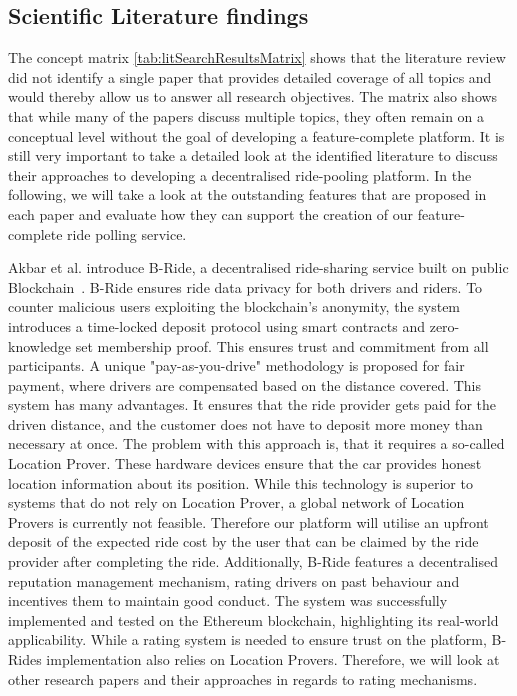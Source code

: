 \subsection{Scientific Literature findings}
The concept matrix \ref{tab:litSearchResultsMatrix} shows that the literature review did not identify a single paper that provides detailed coverage of all topics and would thereby allow us to answer all research objectives. The matrix also shows that while many of the papers discuss multiple topics, they often remain on a conceptual level without the goal of developing a feature-complete platform. It is still very important to take a detailed look at the identified literature to discuss their approaches to developing a decentralised ride-pooling platform. In the following, we will take a look at the outstanding features that are proposed in each paper and evaluate how they can support the creation of our feature-complete ride polling service.


Akbar et al. introduce B-Ride, a decentralised ride-sharing service built on public Blockchain~\cite{Baza.2021}. B-Ride ensures ride data privacy for both drivers and riders. To counter malicious users exploiting the blockchain's anonymity, the system introduces a time-locked deposit protocol using smart contracts and zero-knowledge set membership proof. This ensures trust and commitment from all participants. A unique "pay-as-you-drive" methodology is proposed for fair payment, where drivers are compensated based on the distance covered. This 
system has many advantages. It ensures that the ride provider gets paid for the driven distance, and the customer does not have to deposit more money than necessary at once. The problem with this approach is, that it requires a so-called Location Prover. These hardware devices ensure that the car provides honest location information about its position. While this technology is superior to systems that do not rely on Location Prover, a global network of Location Provers is currently not feasible. Therefore our platform will utilise an upfront deposit of the expected ride cost by the user that can be claimed by the ride provider after completing the ride.
Additionally, B-Ride features a decentralised reputation management mechanism, rating drivers on past behaviour and incentives them to maintain good conduct. The system was successfully implemented and tested on the Ethereum blockchain, highlighting its real-world applicability. While a rating system is needed to ensure trust on the platform, B-Rides implementation also relies on Location Provers. Therefore, we will look at other research papers and their approaches in regards to rating mechanisms.

